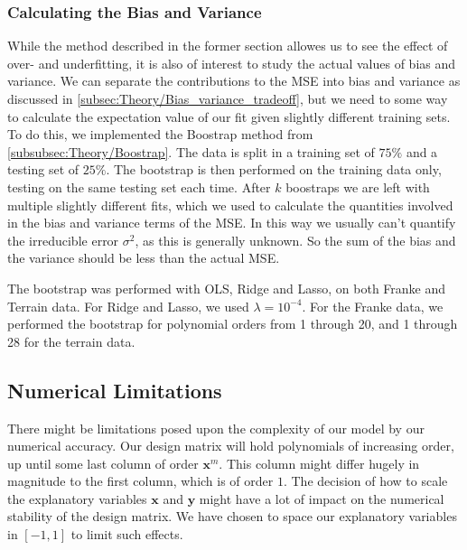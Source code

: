\documentclass[10pt, twocolumn]{article}
\renewcommand{\b}{\boldsymbol}
\begin{document}
\subsubsection{Calculating the Bias and Variance}
While the method described in the former section allowes us to see the effect of over- and underfitting, it is also of interest to study the actual values of bias and variance. We can separate the contributions to the MSE into bias and variance as discussed in \cref{subsec:Theory/Bias_variance_tradeoff}, but we need to some way to calculate the expectation value of our fit given slightly different training sets. To do this, we implemented the Boostrap method from \cref{subsubsec:Theory/Boostrap}. The data is split in a training set of $75\%$ and a testing set of $25\%$. The bootstrap is then performed on the training data only, testing on the same testing set each time. After $k$ boostraps we are left with multiple slightly different fits, which we used to calculate the quantities involved in the bias and variance terms of the MSE. In this way we usually can't quantify the irreducible error $\sigma^2$, as this is generally unknown. So the sum of the bias and the variance should be less than the actual MSE.

The bootstrap was performed with OLS, Ridge and Lasso, on both Franke and Terrain data. For Ridge and Lasso, we used $\lambda=10^{-4}$. For the Franke data, we performed the bootstrap for polynomial orders from 1 through 20, and 1 through 28 for the terrain data. 



\subsection{Numerical Limitations}
\label{subsubsec: numerical_limitations_method}
There might be limitations posed upon the complexity of our model by our numerical accuracy. Our design matrix will hold polynomials of increasing order, up until some last column of order $\b x^m$. This column might differ hugely in magnitude to the first column, which is of order $1$. The decision of how to scale the explanatory variables $\b x$ and $\b y$ might have a lot of impact on the numerical stability of the design matrix. We have chosen to space our explanatory variables in $[-1, 1]$ to limit such effects.
\end{document}
